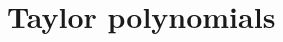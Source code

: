 \documentclass[../book/calcnotes.tex]{subfiles}
\begin{document}
\section{Taylor polynomials}
\label{sec:taylor-polynomials}

\begin{exercises}
\end{exercises}
\end{document}
